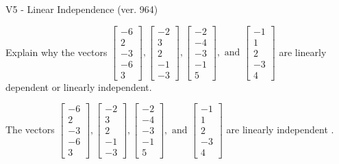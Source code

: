 \begin{exercise}
  \begin{exerciseTitle}V5 - Linear Independence (ver. 964)\end{exerciseTitle}
  \begin{exerciseStatement}
    Explain why the vectors \(\left[\begin{array}{r}
-6 \\
2 \\
-3 \\
-6 \\
3
\end{array}\right] , \left[\begin{array}{r}
-2 \\
3 \\
2 \\
-1 \\
-3
\end{array}\right] , \left[\begin{array}{r}
-2 \\
-4 \\
-3 \\
-1 \\
5
\end{array}\right] , \text{ and } \left[\begin{array}{r}
-1 \\
1 \\
2 \\
-3 \\
4
\end{array}\right]\) are linearly dependent or linearly independent.	


  \end{exerciseStatement}
  \begin{exerciseAnswer}
   The vectors \(\left[\begin{array}{r}
-6 \\
2 \\
-3 \\
-6 \\
3
\end{array}\right] , \left[\begin{array}{r}
-2 \\
3 \\
2 \\
-1 \\
-3
\end{array}\right] , \left[\begin{array}{r}
-2 \\
-4 \\
-3 \\
-1 \\
5
\end{array}\right] , \text{ and } \left[\begin{array}{r}
-1 \\
1 \\
2 \\
-3 \\
4
\end{array}\right]\) are 
  	 linearly independent  .
  


  \end{exerciseAnswer}
\end{exercise}